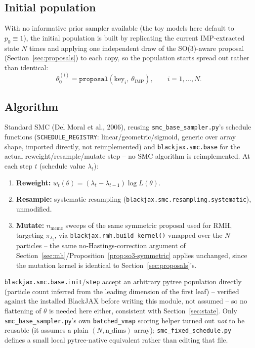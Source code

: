 \documentclass[11pt]{article}
\begin{document}
\subsection{Initial population}

With no informative prior sampler available (the toy models here default to
$p_0 \equiv 1$), the initial population is built by replicating the
current IMP-extracted state $N$ times and applying one independent draw of
the SO(3)-aware proposal (Section~\ref{sec:proposals}) to each copy, so the
population starts spread out rather than identical:
\[
  \theta^{(i)}_0 = \texttt{proposal}(\text{key}_i,\ \theta_{\text{IMP}}), \qquad i = 1,\dots,N.
\]

\subsection{Algorithm}

Standard SMC (Del Moral et al., 2006), reusing
\texttt{smc\_base\_sampler.py}'s schedule functions
(\texttt{SCHEDULE\_REGISTRY}: linear/geometric/sigmoid, generic over array
shape, imported directly, not reimplemented) and \texttt{blackjax.smc.base}
for the actual reweight/resample/mutate step -- no SMC algorithm is
reimplemented. At each step $t$ (schedule value $\lambda_t$):
\begin{enumerate}
  \item \textbf{Reweight:} $w_t(\theta) = (\lambda_t - \lambda_{t-1})\log L(\theta)$.
  \item \textbf{Resample:} systematic resampling
    (\texttt{blackjax.smc.resampling.systematic}), unmodified.
  \item \textbf{Mutate:} $n_{\text{mcmc}}$ sweeps of the same symmetric
    proposal used for RMH, targeting $\pi_{\lambda_t}$, via
    \texttt{blackjax.rmh.build\_kernel()} vmapped over the $N$ particles --
    the same no-Hastings-correction argument of
    Section~\ref{sec:mh}/Proposition~\ref{prop:so3-symmetric} applies
    unchanged, since the mutation kernel is identical to
    Section~\ref{sec:proposals}'s.
\end{enumerate}
\texttt{blackjax.smc.base.init}/\texttt{step} accept an arbitrary pytree
population directly (particle count inferred from the leading dimension of
the first leaf) -- verified against the installed BlackJAX before writing
this module, not assumed -- so no flattening of $\theta$ is needed here
either, consistent with Section~\ref{sec:state}. Only
\texttt{smc\_base\_sampler.py}'s own \texttt{batched\_vmap} scoring helper
turned out \emph{not} to be reusable (it assumes a plain
$(N,\text{n\_dims})$ array); \texttt{smc\_fixed\_schedule.py} defines a
small local pytree-native equivalent rather than editing that file.
\end{document}
